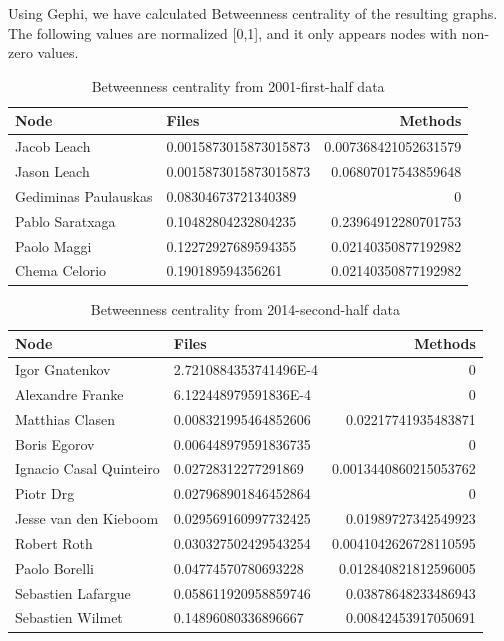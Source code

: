 \documentclass[a4paper]{article}
\begin{document}
Using Gephi, we have calculated Betweenness centrality of the resulting
graphs.
The following values are normalized [0,1], and it only appears nodes with
non-zero values.

\begin{table}[ht]
\begin{center}
\caption{Betweenness centrality from 2001-first-half data}
\bigskip

\begin{tabular}{|l|l|r|}
\hline
Node & Files & Methods\\ \hline
Jacob Leach & 0.0015873015873015873 & 0.007368421052631579\\
Jason Leach & 0.0015873015873015873 & 0.06807017543859648\\
Gediminas Paulauskas & 0.08304673721340389 & 0\\
Pablo Saratxaga & 0.10482804232804235 & 0.23964912280701753\\
Paolo Maggi & 0.12272927689594355 & 0.02140350877192982\\
Chema Celorio & 0.190189594356261 & 0.02140350877192982\\ \hline
\end{tabular}
\end{center}
\end{table}

\begin{table}[ht]
\begin{center}
\caption{Betweenness centrality from 2014-second-half data}
\bigskip

\begin{tabular}{|l|l|r|}
\hline
Node & Files & Methods\\ \hline
Igor Gnatenkov & 2.7210884353741496E-4 & 0\\
Alexandre Franke & 6.122448979591836E-4 & 0\\
Matthias Clasen & 0.008321995464852606 & 0.02217741935483871\\
Boris Egorov & 0.006448979591836735 & 0\\
Ignacio Casal Quinteiro & 0.02728312277291869 & 0.0013440860215053762\\
Piotr Drg & 0.027968901846452864 & 0\\
Jesse van den Kieboom & 0.029569160997732425 & 0.01989727342549923\\
Robert Roth & 0.030327502429543254 & 0.0041042626728110595\\
Paolo Borelli & 0.04774570780693228 & 0.012840821812596005\\
Sebastien Lafargue & 0.058611920958859746 & 0.03878648233486943\\
Sebastien Wilmet & 0.14896080336896667 & 0.00842453917050691\\ \hline
\end{tabular}
\end{center}
\end{table}
\end{document}
